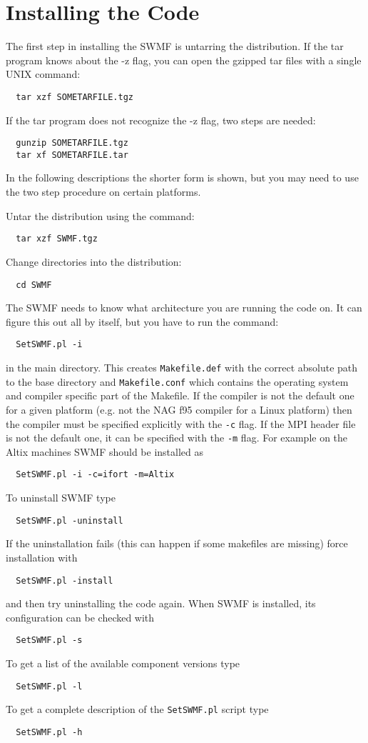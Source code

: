 \section{Installing the Code}

The first step in installing the SWMF is untarring the distribution.
If the tar program knows about the -z flag, you can open the gzipped
tar files with a single UNIX command:
\begin{verbatim}
  tar xzf SOMETARFILE.tgz
\end{verbatim}
If the tar program does not recognize the -z flag, two steps are needed:
\begin{verbatim}
  gunzip SOMETARFILE.tgz
  tar xf SOMETARFILE.tar
\end{verbatim}
In the following descriptions the shorter form is shown, but you may
need to use the two step procedure on certain platforms.

Untar the distribution using the command:
\begin{verbatim}
  tar xzf SWMF.tgz
\end{verbatim}

Change directories into the distribution:
\begin{verbatim}
  cd SWMF
\end{verbatim}

The SWMF needs to know what architecture you are running the code on.
It can figure this out all by itself, but you have to run the command:
\begin{verbatim}
  SetSWMF.pl -i
\end{verbatim}
in the main directory. This creates {\tt Makefile.def} with
the correct absolute path to the base directory and {\tt Makefile.conf}
which contains the operating system and compiler specific part of
the Makefile. If the compiler is not the default one for a given
platform (e.g. not the NAG f95 compiler for a Linux platform) then
the compiler must be specified explicitly with the {\tt -c}
flag. If the MPI header file is not the default one, it can be
specified with the {\tt -m} flag. For example on the Altix machines
SWMF should be installed as
\begin{verbatim}
  SetSWMF.pl -i -c=ifort -m=Altix
\end{verbatim}
To uninstall SWMF type
\begin{verbatim}
  SetSWMF.pl -uninstall
\end{verbatim}
If the uninstallation fails (this can happen if some makefiles are missing)
force installation with
\begin{verbatim}
  SetSWMF.pl -install
\end{verbatim}
and then try uninstalling the code again.
When SWMF is installed, its configuration can be checked with
\begin{verbatim}
  SetSWMF.pl -s
\end{verbatim}
To get a list of the available component versions type
\begin{verbatim}
  SetSWMF.pl -l
\end{verbatim}
To get a complete description of the {\tt SetSWMF.pl}  script type
\begin{verbatim}
  SetSWMF.pl -h
\end{verbatim}

